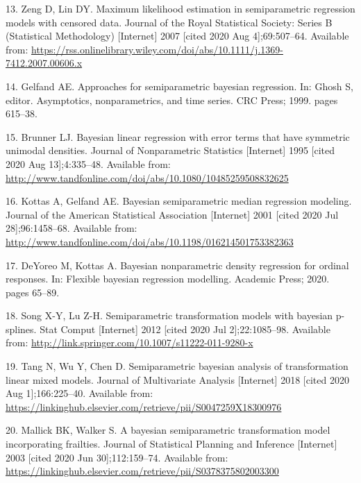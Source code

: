 \documentclass[
]{article}
\begin{document}
\leavevmode\hypertarget{ref-zeng_maximum_2007}{}%
13. Zeng D, Lin DY. Maximum likelihood estimation in semiparametric regression models with censored data. Journal of the Royal Statistical Society: Series B (Statistical Methodology) {[}Internet{]} 2007 {[}cited 2020 Aug 4{]};69:507--64. Available from: \url{https://rss.onlinelibrary.wiley.com/doi/abs/10.1111/j.1369-7412.2007.00606.x}

\leavevmode\hypertarget{ref-gelfand_approaches_1999}{}%
14. Gelfand AE. Approaches for semiparametric bayesian regression. In: Ghosh S, editor. Asymptotics, nonparametrics, and time series. CRC Press; 1999. pages 615--38.

\leavevmode\hypertarget{ref-brunner_bayesian_1995}{}%
15. Brunner LJ. Bayesian linear regression with error terms that have symmetric unimodal densities. Journal of Nonparametric Statistics {[}Internet{]} 1995 {[}cited 2020 Aug 13{]};4:335--48. Available from: \url{http://www.tandfonline.com/doi/abs/10.1080/10485259508832625}

\leavevmode\hypertarget{ref-kottas_bayesian_2001}{}%
16. Kottas A, Gelfand AE. Bayesian semiparametric median regression modeling. Journal of the American Statistical Association {[}Internet{]} 2001 {[}cited 2020 Jul 28{]};96:1458--68. Available from: \url{http://www.tandfonline.com/doi/abs/10.1198/016214501753382363}

\leavevmode\hypertarget{ref-deyoreo_bayesian_2020}{}%
17. DeYoreo M, Kottas A. Bayesian nonparametric density regression for ordinal responses. In: Flexible bayesian regression modelling. Academic Press; 2020. pages 65--89.

\leavevmode\hypertarget{ref-song_semiparametric_2012}{}%
18. Song X-Y, Lu Z-H. Semiparametric transformation models with bayesian p-splines. Stat Comput {[}Internet{]} 2012 {[}cited 2020 Jul 2{]};22:1085--98. Available from: \url{http://link.springer.com/10.1007/s11222-011-9280-x}

\leavevmode\hypertarget{ref-tang_semiparametric_2018}{}%
19. Tang N, Wu Y, Chen D. Semiparametric bayesian analysis of transformation linear mixed models. Journal of Multivariate Analysis {[}Internet{]} 2018 {[}cited 2020 Aug 1{]};166:225--40. Available from: \url{https://linkinghub.elsevier.com/retrieve/pii/S0047259X18300976}

\leavevmode\hypertarget{ref-mallick_bayesian_2003}{}%
20. Mallick BK, Walker S. A bayesian semiparametric transformation model incorporating frailties. Journal of Statistical Planning and Inference {[}Internet{]} 2003 {[}cited 2020 Jun 30{]};112:159--74. Available from: \url{https://linkinghub.elsevier.com/retrieve/pii/S0378375802003300}
\end{document}
